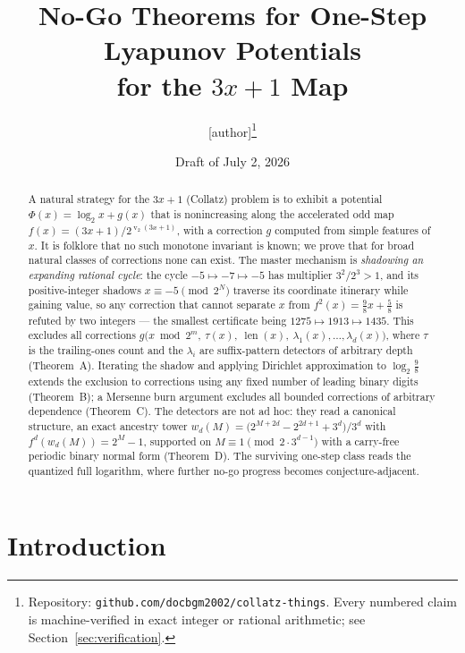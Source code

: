 \documentclass[11pt]{article}
\title{No-Go Theorems for One-Step Lyapunov Potentials\\ for the $3x+1$ Map}
\author{[author]\thanks{Repository: \texttt{github.com/docbgm2002/collatz-things}.
Every numbered claim is machine-verified in exact integer or rational
arithmetic; see Section~\ref{sec:verification}.}}
\date{Draft of July 2, 2026}
\theoremstyle{definition}
\theoremstyle{remark}
\newcommand{\bitlen}{\operatorname{len}}
\DeclareMathOperator{\vv}{v}
\begin{document}
\maketitle

\begin{abstract}
A natural strategy for the $3x+1$ (Collatz) problem is to exhibit a
potential $\Phi(x)=\log_2x+g(x)$ that is nonincreasing along the
accelerated odd map $f(x)=(3x+1)/2^{\vv_2(3x+1)}$, with a correction $g$
computed from simple features of $x$. It is folklore that no such
monotone invariant is known; we prove that for broad natural classes of
corrections none can exist. The master mechanism is \emph{shadowing an
expanding rational cycle}: the cycle $-5\mapsto-7\mapsto-5$ has
multiplier $3^2/2^3>1$, and its positive-integer shadows
$x\equiv-5\pmod{2^N}$ traverse its coordinate itinerary while gaining
value, so any correction that cannot separate $x$ from
$f^2(x)=\tfrac98x+\tfrac58$ is refuted by two integers --- the smallest
certificate being $1275\mapsto1913\mapsto1435$. This excludes all
corrections $g\bigl(x\bmod2^m,\ \tau(x),\ \bitlen(x),\
\lambda_1(x),\dots,\lambda_d(x)\bigr)$, where $\tau$ is the
trailing-ones count and the $\lambda_i$ are suffix-pattern detectors of
arbitrary depth (Theorem~A). Iterating the shadow and applying
Dirichlet approximation to $\log_2\frac98$ extends the exclusion to
corrections using any fixed number of leading binary digits
(Theorem~B); a Mersenne burn argument excludes all bounded corrections
of arbitrary dependence (Theorem~C). The detectors are not ad hoc: they
read a canonical structure, an exact ancestry tower
$w_d(M)=\bigl(2^{M+2d}-2^{2d+1}+3^{d}\bigr)/3^{d}$ with
$f^{d}(w_d(M))=2^{M}-1$, supported on $M\equiv1\pmod{2\cdot3^{d-1}}$
with a carry-free periodic binary normal form (Theorem~D). The
surviving one-step class reads the quantized full logarithm, where
further no-go progress becomes conjecture-adjacent.
\end{abstract}

\section{Introduction}
\end{document}
